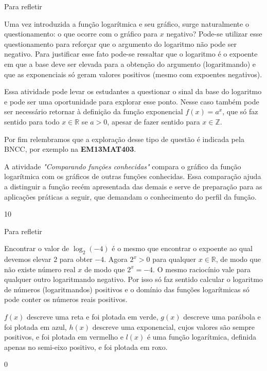 \begin{sugestions}{Para refletir}
{
	Uma vez introduzida a função logarítmica e seu gráfico, surge naturalmente o questionamento: o que ocorre com o gráfico para $x$ negativo? Pode-se utilizar esse questionamento para reforçar que o argumento do logaritmo não pode ser negativo. Para justificar esse fato pode-se ressaltar que o logaritmo é o expoente em que a base deve ser elevada para a obtenção do argumento (logaritmando) e que as exponenciais só geram valores positivos (mesmo com expoentes negativos).

	Essa atividade pode levar os estudantes a questionar o sinal da base do logaritmo e pode ser uma oportunidade para explorar esse ponto. Nesse caso também pode ser necessário retornar à definição da função exponencial $f(x)=a^x$, que só faz sentido para todo $x \in \mathbb{R}$ se $a>0$, apesar de fazer sentido para $x \in \mathbb{Z}$.

	Por fim relembramos que a exploração desse tipo de questão é indicada pela BNCC, por exemplo na \textbf{EM13MAT403}.


	A atividade \textit{"Comparando funções conhecidas"} compara o gráfico da função logarítmica com os gráficos de outras funções conhecidas. Essa comparação ajuda a distinguir a função recém apresentada das demais e serve de preparação para as aplicações práticas a seguir, que demandam o conhecimento do perfil da função.
}{1}{0}
\end{sugestions}
\begin{answer}{Para refletir}
{
	Encontrar o valor de $\log_2 (-4)$ é o mesmo que encontrar o expoente ao qual devemos elevar $2$ para obter $-4$. Agora $2^x>0$ para qualquer $x \in \mathbb{R}$, de modo que não existe número real $x$ de modo que $2^x=-4$. O mesmo raciocínio vale para qualquer outro logaritmando negativo. Por isso só faz sentido calcular o logaritmo de números (logaritmandos) positivos e o domínio das funções logarítmicas só pode conter os números reais positivos.


	$f(x)$ descreve uma reta e foi plotada em verde, $g(x)$ descreve uma parábola e foi plotada em azul, $h(x)$ descreve uma exponencial, cujos valores são sempre positivos, e foi plotada em vermelho e $l(x)$ é uma função logarítmica, definida apenas no semi-eixo positivo, e foi plotada em roxo.
}{0}
\end{answer}

